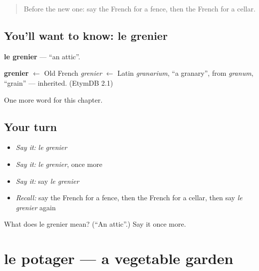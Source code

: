 \label{lesson:FR-C200-grenier}



\begin{quote}
Before the new one: say the French for a fence, then the French for a cellar.
\end{quote}

\subsection*{You'll want to know: le grenier}
\textbf{le grenier} — \textquotedblleft{}an attic\textquotedblright{}.

\begin{cousinweb}
\textbf{grenier} $\leftarrow$ Old French \emph{grenier} $\leftarrow$ Latin \emph{granarium}, \textquotedblleft{}a granary\textquotedblright{}, from \emph{granum}, \textquotedblleft{}grain\textquotedblright{} — inherited. (EtymDB 2.1)
\end{cousinweb}

\begin{grammarlens}[title={What you've built}]
One more word for this chapter.
\end{grammarlens}

\subsection*{Your turn}
\begin{itemize}
\raggedright
  \item \emph{Say it:} \emph{le grenier}
  \item \emph{Say it:} \emph{le grenier}, once more
  \item \emph{Say it:} say \emph{le grenier}
  \item \emph{Recall:} say the French for a fence, then the French for a cellar, then say \emph{le grenier} again
\end{itemize}

\begin{tcolorbox}[breakable,colback=teal!4,colframe=teal!35!black,title={Before you move on}]
What does le grenier mean? (\textquotedblleft{}An attic\textquotedblright{}.) Say it once more.
\end{tcolorbox}
\section[le potager]{le potager — a vegetable garden}

\label{lesson:FR-C200-potager}



